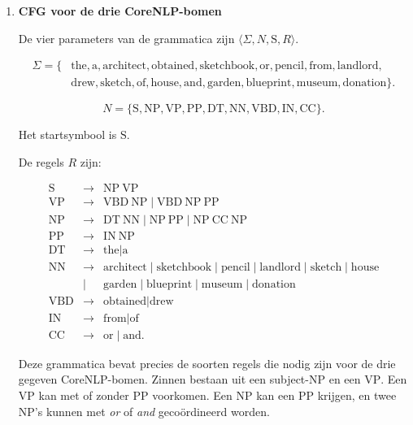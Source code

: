 \documentclass[11pt,a4paper]{article}
\newcommand{\nt}[1]{\ensuremath{\mathrm{#1}}}
\newcommand{\lex}[1]{\textit{#1}}
\begin{document}
\begin{enumerate}

\item \textbf{CFG voor de drie CoreNLP-bomen}

De vier parameters van de grammatica zijn $\langle \Sigma, N, \nt{S}, R\rangle$.

\[
\begin{aligned}
\Sigma = \{&\text{the}, \text{a}, \text{architect}, \text{obtained}, \text{sketchbook}, \text{or}, \text{pencil}, \text{from}, \text{landlord},\\
&\text{drew}, \text{sketch}, \text{of}, \text{house}, \text{and}, \text{garden}, \text{blueprint}, \text{museum}, \text{donation}\}.
\end{aligned}
\]

\[
N = \{\nt{S}, \nt{NP}, \nt{VP}, \nt{PP}, \nt{DT}, \nt{NN}, \nt{VBD}, \nt{IN}, \nt{CC}\}.
\]

Het startsymbool is $\nt{S}$.

De regels $R$ zijn:

\[
\begin{array}{rcl}
\nt{S} &\rightarrow& \nt{NP}\ \nt{VP} \\
\nt{VP} &\rightarrow& \nt{VBD}\ \nt{NP} \mid \nt{VBD}\ \nt{NP}\ \nt{PP} \\
\nt{NP} &\rightarrow& \nt{DT}\ \nt{NN} \mid \nt{NP}\ \nt{PP} \mid \nt{NP}\ \nt{CC}\ \nt{NP} \\
\nt{PP} &\rightarrow& \nt{IN}\ \nt{NP} \\[1mm]
\nt{DT} &\rightarrow& \text{the} \mid \text{a} \\
\nt{NN} &\rightarrow& \text{architect} \mid \text{sketchbook} \mid \text{pencil} \mid \text{landlord} \mid \text{sketch} \mid \text{house} \\
   &\mid& \text{garden} \mid \text{blueprint} \mid \text{museum} \mid \text{donation} \\
\nt{VBD} &\rightarrow& \text{obtained} \mid \text{drew} \\
\nt{IN} &\rightarrow& \text{from} \mid \text{of} \\
\nt{CC} &\rightarrow& \text{or} \mid \text{and}.
\end{array}
\]

Deze grammatica bevat precies de soorten regels die nodig zijn voor de drie gegeven CoreNLP-bomen. Zinnen bestaan uit een subject-$\nt{NP}$ en een $\nt{VP}$. Een $\nt{VP}$ kan met of zonder $\nt{PP}$ voorkomen. Een $\nt{NP}$ kan een $\nt{PP}$ krijgen, en twee $\nt{NP}$'s kunnen met \lex{or} of \lex{and} gecoördineerd worden.


\end{enumerate}
\end{document}
